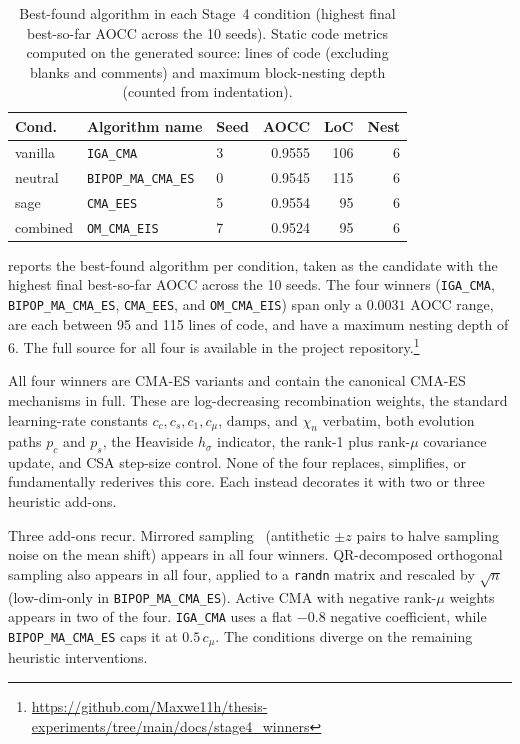\begin{table}[t]
\centering
\caption{Best-found algorithm in each Stage~4 condition (highest final best-so-far AOCC across the 10 seeds). Static code metrics computed on the generated source: lines of code (excluding blanks and comments) and maximum block-nesting depth (counted from indentation).}
\label{tab:phase4-winners}
\footnotesize
\setlength{\tabcolsep}{4pt}
\begin{tabular}{@{}l|llrrr@{}}
\toprule
\textbf{Cond.} & \textbf{Algorithm name} & \textbf{Seed} & \textbf{AOCC} & \textbf{LoC} & \textbf{Nest} \\
\midrule
vanilla  & \texttt{IGA\_CMA}          & 3 & 0.9555 & 106 & 6 \\
neutral  & \texttt{BIPOP\_MA\_CMA\_ES} & 0 & 0.9545 & 115 & 6 \\
sage     & \texttt{CMA\_EES}          & 5 & 0.9554 &  95 & 6 \\
combined & \texttt{OM\_CMA\_EIS}       & 7 & 0.9524 &  95 & 6 \\
\bottomrule
\end{tabular}
\end{table}

 reports the best-found algorithm per condition, taken as the candidate with the highest final best-so-far AOCC across the 10 seeds. The four winners (\texttt{IGA\_CMA}, \texttt{BIPOP\_MA\_CMA\_ES}, \texttt{CMA\_EES}, and \texttt{OM\_CMA\_EIS}) span only a $0.0031$ AOCC range, are each between 95 and 115 lines of code, and have a maximum nesting depth of 6. The full source for all four is available in the project repository.\footnote{\url{https://github.com/Maxwe11h/thesis-experiments/tree/main/docs/stage4_winners}}

All four winners are CMA-ES \cite{hansen2001cmaes} variants and contain the canonical CMA-ES mechanisms in full. These are log-decreasing recombination weights, the standard learning-rate constants $c_c, c_s, c_1, c_\mu$, $\text{damps}$, and $\chi_n$ verbatim, both evolution paths $p_c$ and $p_s$, the Heaviside $h_\sigma$ indicator, the rank-1 plus rank-$\mu$ covariance update, and CSA step-size control. None of the four replaces, simplifies, or fundamentally rederives this core. Each instead decorates it with two or three heuristic add-ons.

Three add-ons recur. Mirrored sampling~\cite{mirrored2010} (antithetic $\pm z$ pairs to halve sampling noise on the mean shift) appears in all four winners. QR-decomposed orthogonal sampling also appears in all four, applied to a \texttt{randn} matrix and rescaled by $\sqrt{n}$ (low-dim-only in \texttt{BIPOP\_MA\_CMA\_ES}). Active CMA with negative rank-$\mu$ weights~\cite{active2006} appears in two of the four. \texttt{IGA\_CMA} uses a flat $-0.8$ negative coefficient, while \texttt{BIPOP\_MA\_CMA\_ES} caps it at $0.5\,c_\mu$. The conditions diverge on the remaining heuristic interventions.

